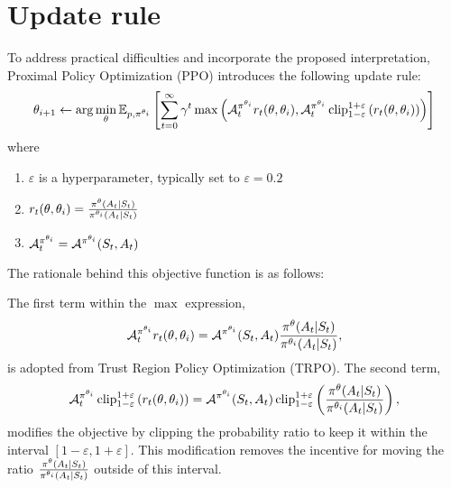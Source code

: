 \documentclass[12pt,twoside]{../../mitthesis}
\begin{document}
\section*{Update rule}
To address practical difficulties and incorporate the proposed interpretation, Proximal Policy Optimization (PPO) introduces the following update rule:
\begin{equation}
    \theta_{i+1} \la \arg\min_{\theta}\E[\transit, \policy^{\theta_i}]{\sum_{t=0}^{\infty} \gamma ^ t \max\left(\Advan_t^{\policy^{\theta_i}} r_t(\theta, \theta_i), \Advan_t^{\policy^{\theta_i}}\operatorname{clip}_{1 - \varepsilon}^{1 + \varepsilon}\left(r_t(\theta, \theta_i) \right)\right)}
\end{equation}
where 
\begin{enumerate}
    \item $\varepsilon$ is a hyperparameter, typically set to $\varepsilon = 0.2$
    \item $r_t(\theta, \theta_i) =  \frac{\policy^{\theta}(\Action_t \mid \State_t)}{\policy^{\theta_i}(\Action_t \mid \State_t)}$
    \item $\Advan_t^{\policy^{\theta_i}} = \Advan^{\policy^{\theta_i}}(\State_t, \Action_t)$
\end{enumerate}
The rationale behind this objective function is as follows:

The first term within the $\max$ expression,
\begin{equation}
    \Advan_t^{\policy^{\theta_i}} r_t(\theta, \theta_i) = \Advan^{\policy^{\theta_i}}(\State_t, \Action_t) \frac{\policy^{\theta}(\Action_t | \State_t)}{\policy^{\theta_i}(\Action_t | \State_t)},
\end{equation}
is adopted from Trust Region Policy Optimization (TRPO). The second term,
\begin{equation}
    \Advan_t^{\policy^{\theta_i}}\operatorname{clip}_{1 - \varepsilon}^{1 + \varepsilon}\left(r_t(\theta, \theta_i) \right) = \Advan^{\policy^{\theta_i}}(\State_t, \Action_t) \operatorname{clip}_{1-\varepsilon}^{1 + \varepsilon}\left(\frac{\policy^{\theta}(\Action_t | \State_t)}{\policy^{\theta_i}(\Action_t | \State_t)}\right),
\end{equation}
modifies the objective by clipping the probability ratio to keep it within the interval $[1 - \varepsilon, 1 + \varepsilon]$. This modification removes the incentive for moving the ratio $\frac{\policy^{\theta}(\Action_t | \State_t)}{\policy^{\theta_i}(\Action_t | \State_t)}$ outside of this interval.
\end{document}
